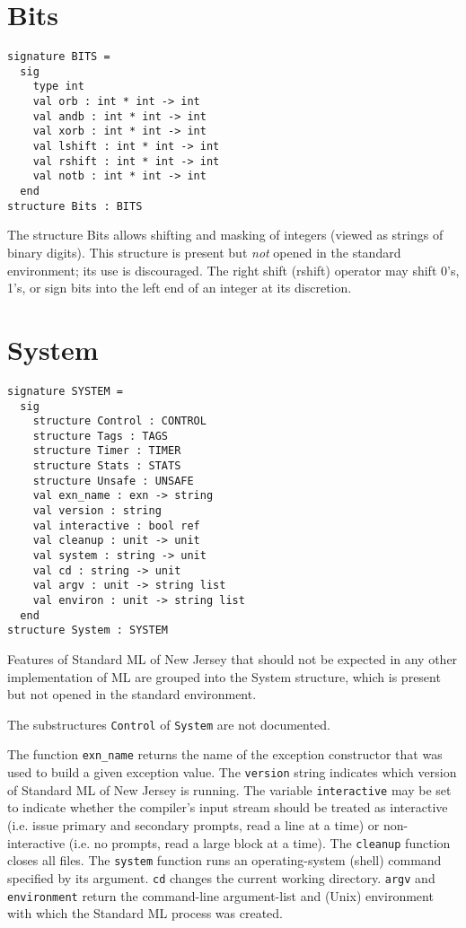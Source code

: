 \section{Bits}
\begin{verbatim}
signature BITS =
  sig
    type int
    val orb : int * int -> int
    val andb : int * int -> int
    val xorb : int * int -> int
    val lshift : int * int -> int
    val rshift : int * int -> int
    val notb : int * int -> int
  end
structure Bits : BITS
\end{verbatim}
The structure Bits allows shifting and masking of integers (viewed as 
strings of binary digits).  This structure is present but
{\em not} opened in the standard environment; its use is discouraged.
The right shift (rshift) operator may shift 0's, 1's, or sign bits
into the left end of an integer at its discretion.
\section{System}
\begin{verbatim}
signature SYSTEM =
  sig
    structure Control : CONTROL
    structure Tags : TAGS
    structure Timer : TIMER
    structure Stats : STATS
    structure Unsafe : UNSAFE
    val exn_name : exn -> string
    val version : string
    val interactive : bool ref
    val cleanup : unit -> unit
    val system : string -> unit
    val cd : string -> unit
    val argv : unit -> string list
    val environ : unit -> string list
  end
structure System : SYSTEM
\end{verbatim}
Features of Standard ML of New Jersey
that should not be expected in any other implementation of ML
are grouped into the System structure, which is present but not opened
in the standard environment.

The substructures \verb"Control" of \verb"System" are not documented.

The function \verb"exn_name" returns the name of the exception constructor
that was used to build a given exception value.  The \verb"version" string
indicates which version of Standard ML of New Jersey is running.
The variable \verb"interactive" may be set to indicate whether the
compiler's input stream should be treated as interactive (i.e. issue
primary and secondary prompts, read a line at a time) or non-interactive
(i.e. no prompts, read a large block at a time).  The \verb"cleanup"
function closes all files.  The \verb"system" function runs an operating-system
(shell) command specified by its argument.  \verb"cd" changes the
current working directory.  \verb"argv" and \verb"environment" return
the command-line
argument-list and (Unix) environment with which the Standard ML 
process was created.
